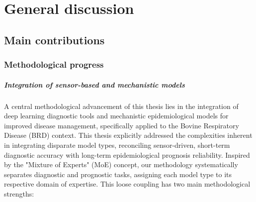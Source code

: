 
\chapter{General discussion} %


\section{Main contributions}

\subsection{Methodological progress}

\paragraph{Integration of sensor-based and mechanistic models} A central methodological advancement of this thesis lies in the integration of deep learning diagnostic tools and mechanistic epidemiological models for improved disease management, specifically applied to the Bovine Respiratory Disease (BRD) context. This thesis explicitly addressed the complexities inherent in integrating disparate model types, reconciling sensor-driven, short-term diagnostic accuracy with long-term epidemiological prognosis reliability. Inspired by the "Mixture of Experts" (MoE) concept, our methodology systematically separates diagnostic and prognostic tasks, assigning each model type to its respective domain of expertise. This loose coupling has two main methodological strengths:

